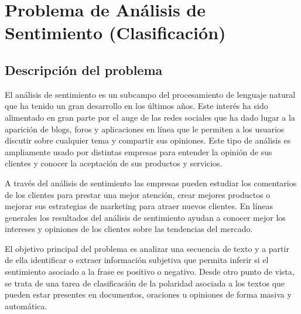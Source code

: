 
\section{Problema de Análisis de Sentimiento (Clasificación)}
\label{section-analisis-de-sentimiento}


\subsection{Descripción del problema}
\label{subsection-as-descripcion-problema}

El análisis de sentimiento es un subcampo del procesamiento de lenguaje natural que ha tenido un gran desarrollo en los últimos años. Este interés ha sido alimentado en gran parte por el auge de las redes sociales que ha dado lugar a la aparición de blogs, foros y aplicaciones en línea que le permiten a los usuarios discutir sobre cualquier tema y compartir sus opiniones. Este tipo de análisis es ampliamente usado por distintas empresas para entender la opinión de sus clientes y conocer la aceptación de sus productos y servicios. 

A través del análisis de sentimiento las empresas pueden estudiar los comentarios de los clientes para prestar una mejor atención, crear mejores productos o mejorar sus estrategias de marketing para atraer nuevos clientes. En líneas generales los resultados del análisis de sentimiento ayudan a conocer mejor los intereses y opiniones de los clientes sobre las tendencias del mercado.

El objetivo principal del problema es analizar una secuencia de texto y a partir de ella identificar o extraer información subjetiva que permita inferir si el sentimiento asociado a la frase es positivo o negativo. Desde otro punto de vista, se trata de una tarea de clasificación de la polaridad asociada a los textos que pueden estar presentes en documentos, oraciones u opiniones de forma masiva y automática. 

